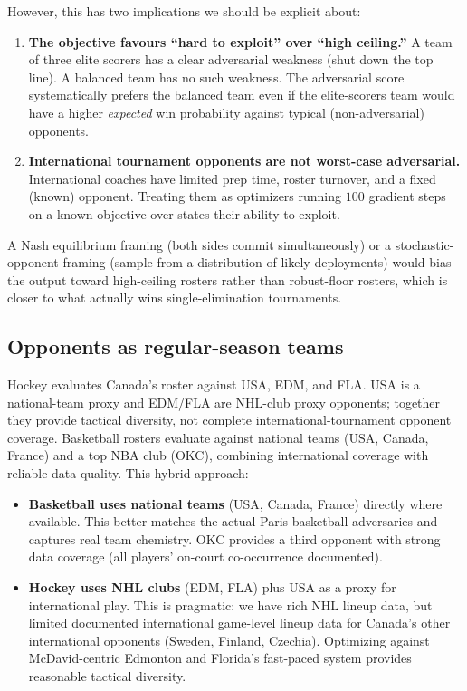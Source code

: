 \documentclass[11pt,letterpaper]{article}
\begin{document}
However, this has two implications we should be explicit about:

\begin{enumerate}[leftmargin=*]
  \item \textbf{The objective favours ``hard to exploit'' over ``high
    ceiling.''} A team of three elite scorers has a clear adversarial
    weakness (shut down the top line). A balanced team has no such
    weakness. The adversarial score systematically prefers the balanced
    team even if the elite-scorers team would have a higher
    \emph{expected} win probability against typical (non-adversarial)
    opponents.
  \item \textbf{International tournament opponents are not worst-case
    adversarial.}
    International coaches have limited prep time, roster turnover, and
    a fixed (known) opponent. Treating them as optimizers running
    $100$ gradient steps on a known objective over-states their
    ability to exploit.
\end{enumerate}

A Nash equilibrium framing (both sides commit simultaneously) or a
stochastic-opponent framing (sample from a distribution of likely
deployments) would bias the output toward high-ceiling rosters rather
than robust-floor rosters, which is closer to what actually wins
single-elimination tournaments.

\subsection{Opponents as regular-season teams}

Hockey evaluates Canada's roster against USA, EDM, and FLA. USA is a
national-team proxy and EDM/FLA are NHL-club proxy opponents; together
they provide tactical diversity, not complete international-tournament
opponent coverage. Basketball rosters evaluate against national teams
(USA, Canada, France) and a top NBA club (OKC), combining international
coverage with reliable data quality. This hybrid approach:

\begin{itemize}[leftmargin=*]
  \item \textbf{Basketball uses national teams} (USA, Canada, France)
    directly where available. This better matches the actual Paris
    basketball adversaries and captures real team chemistry. OKC
    provides a third opponent with strong data coverage (all players'
    on-court co-occurrence documented).
  \item \textbf{Hockey uses NHL clubs} (EDM, FLA) plus USA as a proxy
    for international play. This is pragmatic: we have rich NHL lineup
    data, but limited documented international game-level lineup data
    for Canada's other international opponents (Sweden, Finland,
    Czechia).
    Optimizing against McDavid-centric Edmonton and Florida's fast-paced
    system provides reasonable tactical diversity.
\end{itemize}
\end{document}

